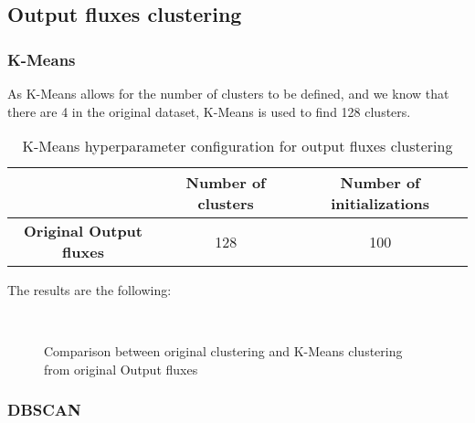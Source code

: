 	\subsection{Output fluxes clustering}

		\subsubsection{K-Means}
			
			As K-Means allows for the number of clusters to be defined, and we know that there are 4 in the original dataset, K-Means is used to find 128 clusters.
			
			\begin{table}[h!]
				\centering
				\begin{tabular}{|c|c|c|}
					\hline
					& \textbf{Number of clusters} & \textbf{Number of initializations}\\
					\hline
					\textbf{Original Output fluxes} & 128 & 100\\
					\hline
				\end{tabular}
				\caption{K-Means hyperparameter configuration for output fluxes clustering}
			\end{table}
		
			The results are the following:
			
			\begin{figure*}[ht!]
				\centering
				\hspace{\fill}
				\\
					
				\hspace{\fill}
				\caption{Comparison between original clustering and K-Means clustering from original Output fluxes}
			\end{figure*}
			\FloatBarrier
		
		\subsubsection{DBSCAN}
			
